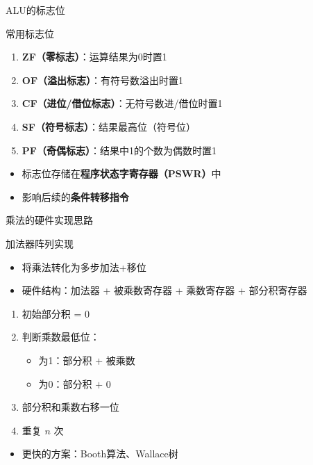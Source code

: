 \documentclass[10pt, aspectratio=169]{beamer}
\begin{document}
\begin{frame}{ALU的标志位}
    \begin{block}{常用标志位}
        \begin{enumerate}
            \item \textbf{ZF（零标志）}：运算结果为0时置1
            \item \textbf{OF（溢出标志）}：有符号数溢出时置1
            \item \textbf{CF（进位/借位标志）}：无符号数进/借位时置1
            \item \textbf{SF（符号标志）}：结果最高位（符号位）
            \item \textbf{PF（奇偶标志）}：结果中1的个数为偶数时置1
        \end{enumerate}
    \end{block}
    \vspace{0.3em}
    \begin{itemize}
        \item 标志位存储在\textbf{程序状态字寄存器（PSWR）}中
        \item 影响后续的\textbf{条件转移指令}
    \end{itemize}
\end{frame}

\begin{frame}{乘法的硬件实现思路}
    \begin{block}{加法器阵列实现}
        \begin{itemize}
            \item 将乘法转化为多步加法+移位
            \item 硬件结构：加法器 + 被乘数寄存器 + 乘数寄存器 + 部分积寄存器
        \end{itemize}
    \end{block}
    \vspace{0.3em}
    \begin{enumerate}
        \item 初始部分积 = 0
        \item 判断乘数最低位：
        \begin{itemize}
            \item 为1：部分积 $+$ 被乘数
            \item 为0：部分积 $+$ 0
        \end{itemize}
        \item 部分积和乘数右移一位
        \item 重复 $n$ 次
    \end{enumerate}
    \vspace{0.3em}
    \begin{itemize}
        \item 更快的方案：Booth算法、Wallace树
    \end{itemize}
\end{frame}
\end{document}
